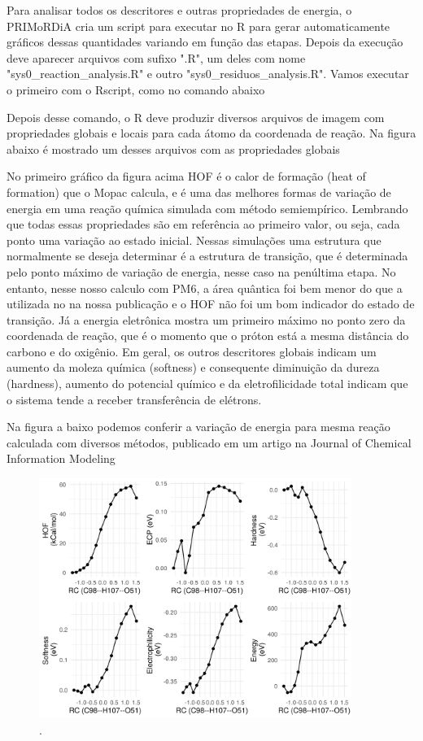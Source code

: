 \documentclass[a4paper,11pt]{refart}
\begin{document}
Para analisar todos os descritores e outras propriedades de energia, o PRIMoRDiA cria um script para executar no R para gerar automaticamente gráficos dessas quantidades variando em função das etapas. Depois da execução deve aparecer arquivos com sufixo ".R", um deles com nome "sys0\_reaction\_analysis.R" e outro "sys0\_residuos\_analysis.R". Vamos executar o primeiro com o Rscript, como no comando abaixo


Depois desse comando, o R deve produzir diversos arquivos de imagem com propriedades globais e locais para cada átomo da coordenada de reação. Na figura abaixo é mostrado um desses arquivos com as propriedades globais

No primeiro gráfico da figura acima HOF é o calor de formação  (heat of formation) que o Mopac calcula, e é uma das melhores formas de variação de energia em uma reação química simulada com método semiempírico. Lembrando que todas essas propriedades são em referência ao primeiro valor, ou seja, cada ponto uma variação ao estado inicial. Nessas simulações uma estrutura que normalmente se deseja determinar é a estrutura de transição, que é determinada pelo ponto máximo de variação de energia, nesse caso na penúltima etapa. No entanto, nesse nosso calculo com PM6, a área quântica foi bem menor do que a utilizada no na nossa publicação e o HOF não foi um bom indicador do estado de transição. Já a energia eletrônica mostra um primeiro máximo no ponto zero da coordenada de reação, que é o momento que o próton está a mesma distância do carbono e do oxigênio. Em geral, os outros descritores globais indicam um aumento da moleza química (softness) e consequente diminuição da dureza (hardness), aumento do potencial químico e da eletrofilicidade total indicam que o sistema tende a receber transferência de elétrons.

Na figura a baixo podemos conferir a variação de energia para mesma reação calculada com diversos métodos, publicado em um artigo na Journal of Chemical Information Modeling 

\hspace*{-\leftmarginwidth}
\begin{minipage}{\fullwidth}
	\begin{figure}[H]
		\begin{center}
			\includegraphics[width=4in]{images/tut6_img2}
			\caption{.}
			\label{fig_tut6_1}
		\end{center}
	\end{figure}
\end{minipage}
\end{document}
